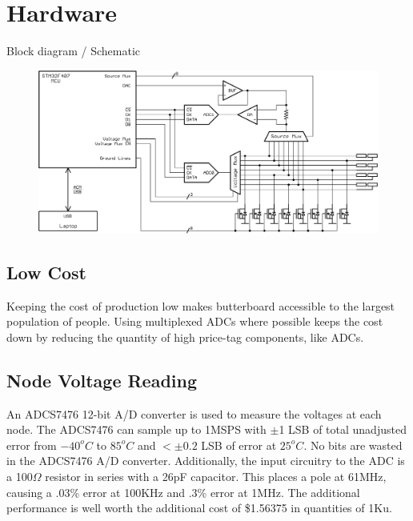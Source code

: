%
\chapter{Hardware}


Block diagram / Schematic


\begin{figure}[h]
  \begin{center}
      \includegraphics[width=1\textwidth]{../circuit.png}
  \end{center}
\end{figure}
\section{Low Cost}

Keeping the cost of production low makes butterboard accessible to the largest population of people.
Using multiplexed ADCs where possible keeps the cost down by reducing the quantity of high price-tag components, like ADCs.

\section{Node Voltage Reading}
An ADCS7476 12-bit A/D converter is used to measure the voltages at each node.
The ADCS7476 can sample up to 1MSPS with $\pm$1 LSB of total unadjusted error from $-40^o C$ to $85^o C$ and $<\pm 0.2$ LSB of error at $25^o C$.
No bits are wasted in the ADCS7476 A/D converter.
Additionally, the input circuitry to the ADC is a 100$\Omega$ resistor in series with a 26pF capacitor.  
This places a pole at 61MHz, causing a .03\% error at 100KHz and .3\% error at 1MHz.
The additional performance is well worth the additional cost of \$1.56375 in quantities of 1Ku.

